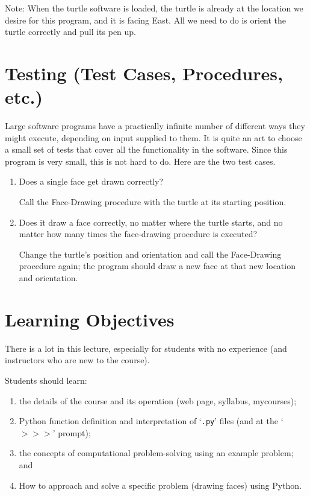 \documentclass[pdftex,12pt]{artikel3}
\begin{document}
Note: 
When the turtle software is loaded, the turtle is already at the location 
we desire for this program, and it is facing East. 
All we need to do is orient the turtle correctly and pull its pen up.

\section{Testing (Test Cases, Procedures, etc.)}

Large software programs have a practically infinite number of different ways they might execute, depending on input supplied to them. It is quite an art to choose a small set of tests that cover all the functionality in the software. 
Since this program is very small, this is not hard to do.
Here are the two test cases.

\begin{enumerate}
\item
Does a single face get drawn correctly?

Call the Face-Drawing procedure with the turtle 
at its starting position.

\item
Does it draw a face correctly, no matter where the turtle starts, 
and no matter how many times the face-drawing procedure is executed?

Change the turtle's position and orientation and 
call the Face-Drawing procedure again; the program should
draw a new face at that new location and orientation.
\end{enumerate}

\newpage


\section{Learning Objectives} %

There is a lot in this lecture, especially for students with
no experience (and instructors who are new to the course).

Students should learn:
\begin{enumerate}
\item
the details of the course and its operation (web page, syllabus, mycourses);
\item
Python function definition and 
interpretation of `{\tt .py}' files (and at the `$>>>$' prompt);
\item
the concepts of computational problem-solving using an example problem;
and
\item
How to approach and solve a specific problem (drawing faces) using Python.
\end{enumerate}
\end{document}
